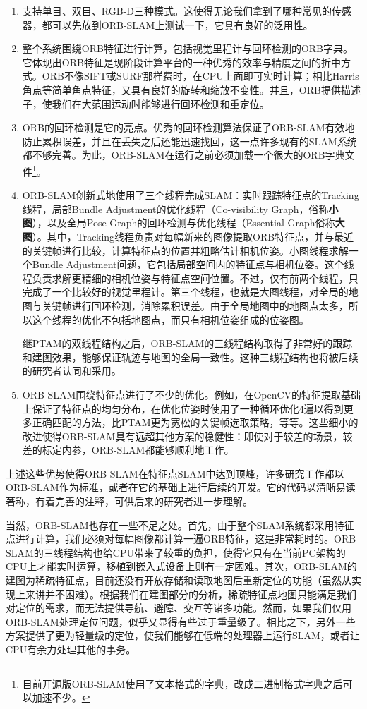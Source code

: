 \begin{enumerate}
	\item 支持单目、双目、RGB-D三种模式。这使得无论我们拿到了哪种常见的传感器，都可以先放到ORB-SLAM上测试一下，它具有良好的泛用性。
	\item 整个系统围绕ORB特征进行计算，包括视觉里程计与回环检测的ORB字典。它体现出ORB特征是现阶段计算平台的一种优秀的效率与精度之间的折中方式。ORB不像SIFT或SURF那样费时，在CPU上面即可实时计算；相比Harris角点等简单角点特征，又具有良好的旋转和缩放不变性。并且，ORB提供描述子，使我们在大范围运动时能够进行回环检测和重定位。
	\item  ORB的回环检测是它的亮点。优秀的回环检测算法保证了ORB-SLAM有效地防止累积误差，并且在丢失之后还能迅速找回，这一点许多现有的SLAM系统都不够完善。为此，ORB-SLAM在运行之前必须加载一个很大的ORB字典\mbox{文件}\footnote{目前开源版ORB-SLAM使用了文本格式的字典，改成二进制格式字典之后可以加速不少。}。
	\item ORB-SLAM创新式地使用了三个线程完成SLAM：实时跟踪特征点的Tracking线程，局部Bundle Adjustment的优化线程（Co-visibility Graph，俗称\textbf{小图}），以及全局Pose Graph的回环检测与优化线程（Essential Graph俗称\textbf{大图}）。其中，Tracking线程负责对每幅新来的图像提取ORB特征点，并与最近的关键帧进行比较，计算特征点的位置并粗略估计相机位姿。小图线程求解一个Bundle Adjustment问题，它包括局部空间内的特征点与相机位姿。这个线程负责求解更精细的相机位姿与特征点空间位置。不过，仅有前两个线程，只完成了一个比较好的视觉里程计。第三个线程，也就是大图线程，对全局的地图与关键帧进行回环检测，消除累积误差。由于全局地图中的地图点太多，所以这个线程的优化不包括地图点，而只有相机位姿组成的位姿图。
	
	\hspace{2em}继PTAM的双线程结构之后，ORB-SLAM的三线程结构取得了非常好的跟踪和建图效果，能够保证轨迹与地图的全局一致性。这种三线程结构也将被后续的研究者认同和采用。
	\item ORB-SLAM围绕特征点进行了不少的优化。例如，在OpenCV的特征提取基础上保证了特征点的均匀分布，在优化位姿时使用了一种循环优化4遍以得到更多正确匹配的方法，比PTAM更为宽松的关键帧选取策略，等等。这些细小的改进使得ORB-SLAM具有远超其他方案的稳健性：即使对于较差的场景，较差的标定内参，ORB-SLAM都能够顺利地工作。
\end{enumerate}

上述这些优势使得ORB-SLAM在特征点SLAM中达到顶峰，许多研究工作都以ORB-SLAM作为标准，或者在它的基础上进行后续的开发。它的代码以清晰易读著称，有着完善的注释，可供后来的研究者进一步理解。

当然，ORB-SLAM也存在一些不足之处。首先，由于整个SLAM系统都采用特征点进行计算，我们必须对每幅图像都计算一遍ORB特征，这是非常耗时的。ORB-SLAM的三线程结构也给CPU带来了较重的负担，使得它只有在当前PC架构的CPU上才能实时运算，移植到嵌入式设备上则有一定困难。其次，ORB-SLAM的建图为稀疏特征点，目前还没有开放存储和读取地图后重新定位的功能（虽然从实现上来讲并不困难）。根据我们在建图部分的分析，稀疏特征点地图只能满足我们对定位的需求，而无法提供导航、避障、交互等诸多功能。然而，如果我们仅用ORB-SLAM处理定位问题，似乎又显得有些过于重量级了。相比之下，另外一些方案提供了更为轻量级的定位，使我们能够在低端的处理器上运行SLAM，或者让CPU有余力处理其他的事务。

